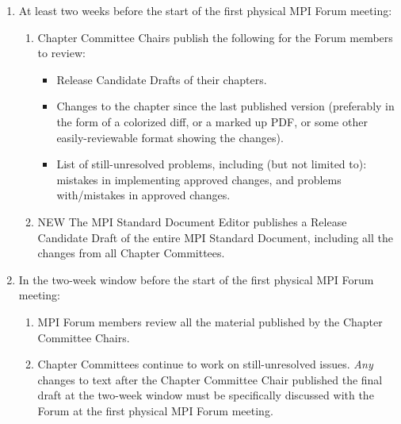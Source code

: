 {{\begin{enumerate}
\item At least two weeks before the start of the first physical MPI
  Forum meeting:
  \begin{enumerate}
  \item Chapter Committee Chairs publish the following for the Forum
    members to review:
    \begin{itemize}
      \item Release Candidate Drafts of their chapters.
      \item Changes to the chapter since the last published version
        (preferably in the form of a colorized diff, or a marked up
        PDF, or some other easily-reviewable format showing the
        changes).
      \item List of still-unresolved problems, including (but not
        limited to): mistakes in implementing approved changes, and
        problems with/mistakes in approved changes.
    \end{itemize}
  \item {\Huge NEW} The MPI Standard Document Editor publishes a
    Release Candidate Draft of the entire MPI Standard Document,
    including all the changes from all Chapter Committees.
  \end{enumerate}

\item In the two-week window before the start of the first physical
  MPI Forum meeting:
  \begin{enumerate}
  \item MPI Forum members review all the material published by the
    Chapter Committee Chairs.
  \item Chapter Committees continue to work on still-unresolved
    issues.  {\em Any} changes to text after the Chapter Committee
    Chair published the final draft at the two-week window must be
    specifically discussed with the Forum at the first physical MPI
    Forum meeting.
  \end{enumerate}


\end{enumerate}}}
